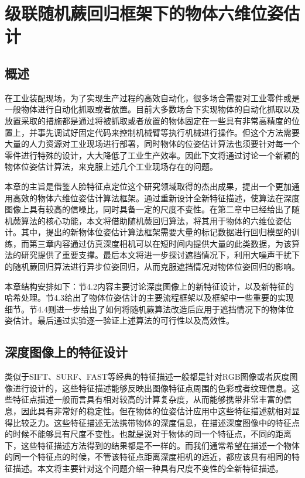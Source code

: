 \chapter{级联随机蕨回归框架下的物体六维位姿估计}

\section{概述}

在工业装配现场，为了实现生产过程的高效自动化，很多场合需要对工业零件或是一般物体进行自动化抓取或者放置。目前大多数场合下实现物体的自动化抓取以及放置采取的措施都是通过将被抓取或者放置的物体固定在一些具有非常高精度的位置上，并事先调试好固定代码来控制机械臂等执行机械进行操作。但这个方法需要大量的人力资源对工业现场进行部署，同时物体的位姿估计算法也须要针对每一个零件进行特殊的设计，大大降低了工业生产效率。因此下文将通过讨论一个新颖的物体位姿估计算法，来克服上述几个工业现场存在的问题。

本章的主旨是借鉴人脸特征点定位这个研究领域取得的杰出成果，提出一个更加通用高效的物体六维位姿估计算法框架。通过重新设计全新特征描述，使算法在深度图像上具有较高的信噪比，同时具备一定的尺度不变性。在第二章中已经给出了随机蕨算法的核心功能，本文将借助随机蕨回归算法，将其用于物体的六维位姿估计。其中，提出的新物体位姿估计算法框架需要大量的标记数据进行回归模型的训练，而第三章内容通过仿真深度相机可以在短时间内提供大量的此类数据，为该算法的研究提供了重要支撑。最后本文将进一步探讨遮挡情况下，利用大噪声干扰下的随机蕨回归算法进行异步位姿回归，从而克服遮挡情况对物体位姿回归的影响。

本章结构安排如下：节4.2内容主要讨论深度图像上的新特征设计，以及新特征的哈希处理。节4.3给出了物体位姿估计的主要流程框架以及框架中一些重要的实现细节。节4.4则进一步给出了如何将随机蕨算法改造后应用于遮挡情况下的物体位姿估计。最后通过实验逐一验证上述算法的可行性以及高效性。

\section{深度图像上的特征设计}

类似于SIFT、SURF、FAST等经典的特征描述一般都是针对RGB图像或者灰度图像进行设计的，这些特征描述能够反映出图像特征点周围的色彩或者纹理信息。这些特征点描述一般而言具有相对较高的计算复杂度，从而能够携带非常丰富的信息，因此具有非常好的稳定性。但在物体的位姿估计应用中这些特征描述就相对显得比较乏力。这些特征描述无法携带物体的深度信息，在描述深度图像中的特征点的时候不能够具有尺度不变性。也就是说对于物体的同一个特征点，不同的距离下，这些特征描述方法得到的结果都是不一样的。而我们通常希望在描述一个物体的同一个特征点的时候，不管该特征点距离深度相机的远近，都应该具有相同的特征描述。本文将主要针对这个问题介绍一种具有尺度不变性的全新特征描述。

